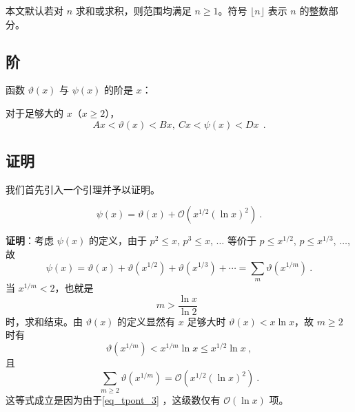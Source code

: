 
本文默认若对 $n$ 求和或求积，则范围均满足 $n \ge 1$。符号 $\lfloor n \rfloor$ 表示 $n$ 的整数部分。
\subsection{阶}
\begin{theorem}{}\label{the_tpont_1}
函数 $\vartheta(x)$ 与 $\psi(x)$ 的阶是 $x$：

对于足够大的 $x$（$x \ge 2$），
\begin{equation}
Ax < \vartheta(x) < Bx, ~ Cx < \psi(x) < Dx ~ ~.
\end{equation}

\end{theorem}

\subsection{证明}
我们首先引入一个引理并予以证明。
\begin{lemma}{}\label{lem_tpont_1}
\begin{equation}
\psi(x) = \vartheta(x) + \mathcal O\left( x^{1/2} (\ln x)^{2} \right) ~.
\end{equation}

\end{lemma}
\textbf{证明}：考虑 $\psi(x)$ 的定义，由于 $p^2 \le x$, $p^3 \le x$, $\dots$ 等价于 $p \le x^{1/2}$, $p \le x^{1/3}$, $\dots$, 故
\begin{equation}\label{eq_tpont_2}
\psi(x) = \vartheta(x) + \vartheta(x^{1/2}) + \vartheta(x^{1/3}) + \cdots = \sum_{m} \vartheta(x^{1/m}) ~.
\end{equation}
当 $x^{1/m} < 2$，也就是
\begin{equation}\label{eq_tpont_3}
m > \frac{\ln x}{\ln 2} ~~
\end{equation}
时，求和结束。由 $\vartheta(x)$ 的定义显然有 $x$ 足够大时 $\vartheta(x) < x \ln x$，故 $m \ge 2$ 时有
\begin{equation}
\vartheta(x^{1/m}) < x^{1/m} \ln x \le x^{1/2} \ln x~,
\end{equation}
且
\begin{equation}\label{eq_tpont_1}
\sum_{m \ge 2} \vartheta(x^{1/m}) = \mathcal O\left( x^{1/2} (\ln x)^{2} \right) ~.
\end{equation}
这等式成立是因为由于\autoref{eq_tpont_3} ，这级数仅有 $\mathcal O(\ln x)$ 项。


